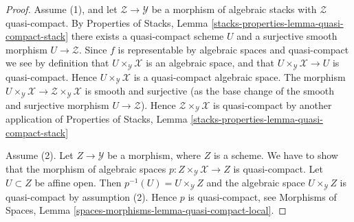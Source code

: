 \documentclass[10pt,a4paper]{amsart}
\theoremstyle{plain}
\theoremstyle{definition}
\theoremstyle{remark}
\numberwithin{equation}{subsection}
\begin{document}
\begin{proof}
Assume (1), and let $\mathcal{Z} \to \mathcal{Y}$
be a morphism of algebraic stacks with $\mathcal{Z}$ quasi-compact. By
Properties of Stacks,
Lemma \ref{stacks-properties-lemma-quasi-compact-stack}
there exists a quasi-compact scheme $U$ and a surjective smooth
morphism $U \to \mathcal{Z}$. Since $f$ is representable by algebraic
spaces and quasi-compact we see by definition that
$U \times_\mathcal{Y} \mathcal{X}$ is an algebraic space, and that
$U \times_\mathcal{Y} \mathcal{X} \to U$ is quasi-compact.
Hence $U \times_\mathcal{Y} \mathcal{X}$ is a quasi-compact algebraic space.
The morphism
$U \times_\mathcal{Y} \mathcal{X} \to
\mathcal{Z} \times_\mathcal{Y} \mathcal{X}$
is smooth and surjective (as the base change of the smooth
and surjective morphism $U \to \mathcal{Z}$).
Hence $\mathcal{Z} \times_\mathcal{Y} \mathcal{X}$
is quasi-compact by another application of
Properties of Stacks,
Lemma \ref{stacks-properties-lemma-quasi-compact-stack}

\medskip\noindent
Assume (2). Let $Z \to \mathcal{Y}$ be a morphism, where $Z$ is a scheme.
We have to show that the morphism of algebraic spaces
$p : Z \times_\mathcal{Y} \mathcal{X} \to Z$ is quasi-compact.
Let $U \subset Z$ be affine open. Then
$p^{-1}(U) = U \times_\mathcal{Y} Z$
and the algebraic space $U \times_\mathcal{Y} Z$
is quasi-compact by assumption (2). Hence $p$ is quasi-compact, see
Morphisms of Spaces, Lemma \ref{spaces-morphisms-lemma-quasi-compact-local}.
\end{proof}
\end{document}
